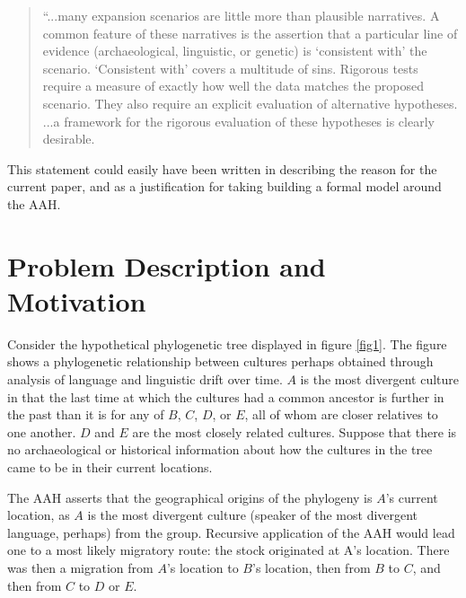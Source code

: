 \documentclass[11pt]{article}
\begin{document}
\begin{quote}
``...many expansion scenarios are little more than plausible narratives. A common feature of these narratives is the assertion that a particular line of evidence (archaeological, linguistic, or genetic) is `consistent with' the scenario. `Consistent with' covers a multitude of sins. Rigorous tests require a measure of exactly how well the data matches the proposed scenario. They also require an explicit evaluation of alternative hypotheses. ...a framework for the rigorous evaluation of these hypotheses is clearly desirable. \citep[p. 31]{greenhill05} 
\end{quote}
This statement could easily have been written in describing the reason for the current paper, and as a justification for taking building a formal model around the AAH.

\section{Problem Description and Motivation}

Consider the hypothetical phylogenetic tree displayed in figure \ref{fig1}. The figure shows a phylogenetic relationship between cultures perhaps obtained through analysis of language and linguistic drift over time. $A$ is the most divergent culture in that the last time at which the cultures had a common ancestor is further in the past than it is for any of $B$, $C$, $D$, or $E$, all of whom are closer relatives to one another. $D$ and $E$ are the most closely related cultures. Suppose that there is no archaeological or historical information about how the cultures in the tree came to be in their current locations.

The AAH asserts that the geographical origins of the phylogeny is $A$'s current location, as $A$  is the most divergent culture (speaker of the most divergent language, perhaps) from the group. Recursive application of the AAH would lead one to a most likely migratory route: the stock originated at A's location. There was then a migration from $A$'s location to $B$'s location, then from $B$ to $C$, and then from $C$ to $D$ or $E$.  
\end{document}
